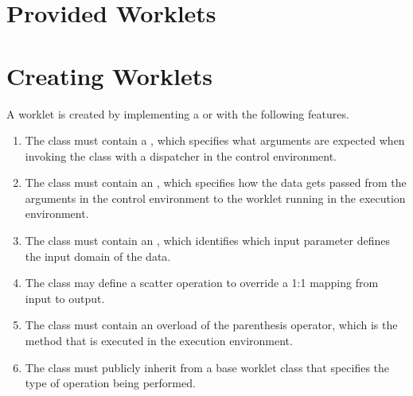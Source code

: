 \begin{description}
\end{description}


\section{Provided Worklets}
\label{sec:ProvidedWorklets}



\section{Creating Worklets}
\label{sec:CreatingWorklets}


A worklet is created by implementing a  or
 with the following features.

\begin{enumerate}
\item The class must contain a \controlsignature {}, which
  specifies what arguments are expected when invoking the class with a
  dispatcher in the control environment.
\item The class must contain an \executionsignature {},
  which specifies how the data gets passed from the arguments in the
  control environment to the worklet running in the execution environment.
\item The class must contain an  {}, which
  identifies which input parameter defines the input domain of the data.
\item The class may define a scatter operation to override a 1:1 mapping
  from input to output.
\item The class must contain an overload of the parenthesis operator, which
  is the method that is executed in the execution environment.
\item The class must publicly inherit from a base worklet class that
  specifies the type of operation being performed.
\end{enumerate}

